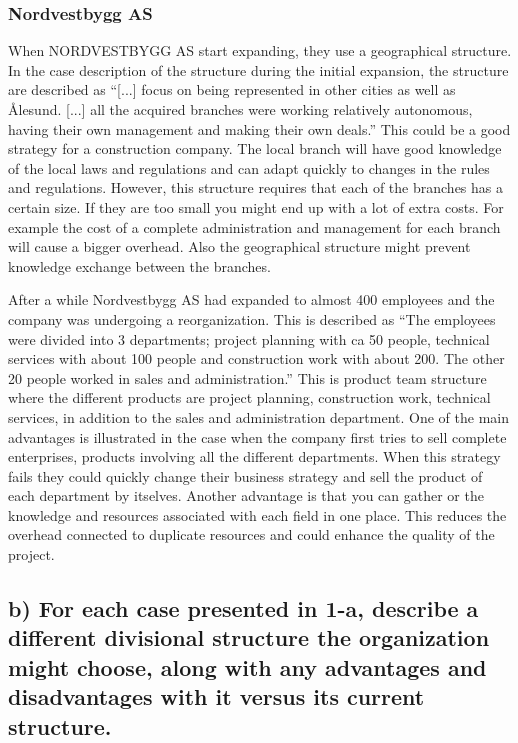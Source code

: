 \documentclass[a4paper]{article}
\begin{document}
    \subsubsection{Nordvestbygg AS} When NORDVESTBYGG AS start expanding, they
    use a geographical structure. In the case description of the structure
    during the initial expansion, the structure are described as ``[...]
    focus on being represented in other cities as well as Ålesund. [...] all
    the acquired branches were working relatively autonomous, having their own
    management and making their own deals.'' This could be a good strategy
    for a construction company. The local branch will have good knowledge of
    the local laws and regulations and can adapt quickly to changes in the
    rules and regulations. However, this structure requires that each of the
    branches has a certain size. If they are too small you might end up with
    a lot of extra costs. For example the cost of a complete administration
    and management for each branch will cause a bigger overhead. Also the
    geographical structure might prevent knowledge exchange between the
    branches.

    After a while Nordvestbygg AS had expanded to almost 400 employees and
    the company was undergoing a reorganization. This is described as ``The
    employees were divided into 3 departments; project planning with ca 50
    people, technical services with about 100 people and construction work
    with about 200. The other 20 people worked in sales and administration.''
    This is product team structure where the different products are project
    planning, construction work, technical services, in addition to the sales
    and administration department. One of the main advantages is illustrated
    in the case when the company first tries to sell complete enterprises,
    products involving all the different departments. When this strategy fails
    they could quickly change their business strategy and sell the product of
    each department by itselves. Another advantage is that you can gather or
    the knowledge and resources associated with each field in one place. This
    reduces the overhead connected to duplicate resources and could enhance
    the quality of the project.

    \subsection*{b) For each case presented in 1-a, describe a different
    divisional structure the organization might choose, along with any
    advantages and disadvantages with it versus its current structure.}
\end{document}
